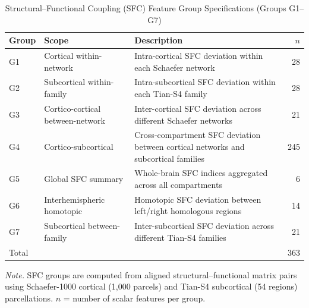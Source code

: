 \documentclass[11pt,a4paper,twoside]{article}
\begin{document}
\begin{table}[H]
\caption{Structural--Functional Coupling (SFC) Feature Group Specifications (Groups G1--G7)}
\label{tab:s4}
\footnotesize
\begin{tabularx}{\linewidth}{l l X r}
\toprule
Group & Scope & Description & $n$ \\
\midrule
G1 & Cortical within-network & Intra-cortical SFC deviation within each Schaefer network & 28 \\
G2 & Subcortical within-family & Intra-subcortical SFC deviation within each Tian-S4 family & 28 \\
G3 & Cortico-cortical between-network & Inter-cortical SFC deviation across different Schaefer networks & 21 \\
G4 & Cortico-subcortical & Cross-compartment SFC deviation between cortical networks and subcortical families & 245 \\
G5 & Global SFC summary & Whole-brain SFC indices aggregated across all compartments & 6 \\
G6 & Interhemispheric homotopic & Homotopic SFC deviation between left/right homologous regions & 14 \\
G7 & Subcortical between-family & Inter-subcortical SFC deviation across different Tian-S4 families & 21 \\
\midrule
\multicolumn{3}{l}{Total} & 363 \\
\bottomrule
\end{tabularx}
\par\smallskip\noindent\small\textit{Note.} SFC groups are computed from aligned structural--functional matrix pairs using Schaefer-1000 cortical (1,000 parcels) and Tian-S4 subcortical (54 regions) parcellations. $n$ = number of scalar features per group.
\end{table}
\end{document}
